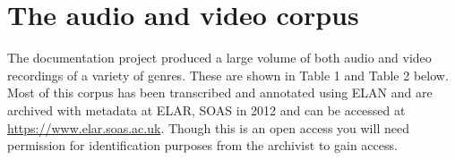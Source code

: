 \documentclass[output=paper,colorlinks,citecolor=brown]{langscibook}
\begin{document}
\section{The audio and video corpus}\label{sec:atintono:5}
The documentation project produced a large volume of both audio and video recordings of a variety of genres. These are shown in Table 1 and Table 2 below. Most of this corpus has been transcribed and annotated using ELAN and are archived with metadata at ELAR, SOAS in 2012 and can be accessed at \url{https://www.elar.soas.ac.uk}. Though this is an open access you will need permission for identification purposes from the archivist to gain access.

\begin{table}
\end{table}
\end{document}
